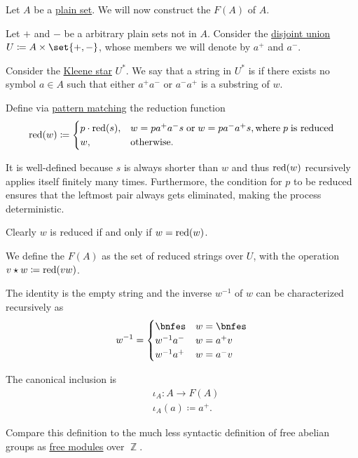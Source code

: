 \begin{definition}\label{def:free_group}\mimprovised
  Let \( A \) be a \hyperref[def:set]{plain set}. We will now construct the  \( F(A) \) of \( A \).

  Let \( + \) and \( - \) be a arbitrary plain sets not in \( A \). Consider the \hyperref[def:disjoint_union]{disjoint union} \( U \coloneqq A \times \set{ +, - } \), whose members we will denote by \( a^+ \) and \( a^- \).

  Consider the \hyperref[def:formal_language/kleene_star]{Kleene star} \( U^* \). We say that a string in \( U^* \) is  if there exists no symbol \( a \in A \) such that either \( a^+ a^- \) or \( a^- a^+ \) is a substring of \( w \).

  Define via \hyperref[con:evaluation]{pattern matching} the reduction function
  \begin{equation*}
    \red(w) \coloneqq \begin{cases}
      p \cdot \red(s), &w = p a^+ a^- s \T{or} w = p a^- a^+ s, \T{where} p \T{is reduced} \\
      w,               &\T{otherwise.}
    \end{cases}
  \end{equation*}

  It is well-defined because \( s \) is always shorter than \( w \) and thus \( \operatorname{red}(w) \) recursively applies itself finitely many times. Furthermore, the condition for \( p \) to be reduced ensures that the leftmost pair always gets eliminated, making the process deterministic.

  Clearly \( w \) is reduced if and only if \( w = \operatorname{red}(w) \).

  We define the  \( F(A) \) as the set of reduced strings over \( U \), with the operation \( v \star w \coloneqq \operatorname{red}(vw) \).

  The identity is the empty string and the inverse \( w^{-1} \) of \( w \) can be characterized recursively as
  \begin{equation*}
    w^{-1} = \begin{cases}
      \bnfes &w = \bnfes \\
      w^{-1} a^-  &w = a^+ v \\
      w^{-1} a^+  &w = a^- v
    \end{cases}
  \end{equation*}

  The canonical inclusion is
  \begin{equation*}
    \begin{aligned}
      &\iota_A: A \to F(A) \\
      &\iota_A(a) \coloneqq a^+.
    \end{aligned}
  \end{equation*}
\end{definition}
\begin{comments}
  \item Compare this definition to the much less syntactic definition of free abelian groups as \hyperref[def:free_semimodule]{free modules} over \( \BbbZ \).
\end{comments}


